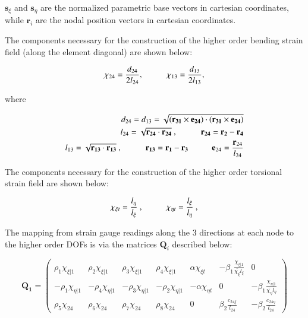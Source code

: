 $\textbf{s}_\xi$ and $\textbf{s}_\eta$ are the normalized parametric base vectors in cartesian coordinates, while $\textbf{r}_i$ are the nodal position vectors in cartesian coordinates.

The components necessary for the construction of the higher order bending strain field (along the element diagonal) are shown below: 

\begin{equation} 
\chi_{24} = \frac{d_{24}}{2 l_{24}},
\hspace{10mm}
\chi_{13} = \frac{d_{13}}{2 l_{13}},
\label{equation12chi24}
\end{equation}

where

\begin{align*} 
	d_{24} = d_{13} = \sqrt{(\mathbf{r_{31}} \times \mathbf{e_{24}}) \cdot (\mathbf{r_{31}} \times \mathbf{e_{24}})} \\
	l_{24} = \sqrt{\mathbf{r_{24}} \cdot \mathbf{r_{24}}}\ ,
	\hspace{10mm}
	\mathbf{r_{24}} = \mathbf{r_2} - \mathbf{r_4} \\
	l_{13} = \sqrt{\mathbf{r_{13}} \cdot \mathbf{r_{13}}}\ ,
	\hspace{10mm}
	\mathbf{r_{13}} = \mathbf{r_1} - \mathbf{r_3}
	\hspace{10mm}
	\mathbf{e}_{24} = \frac{\mathbf{r}_{24}}{l_{24}}
\end{align*}

The components necessary for the construction of the higher order torsional strain field are shown below:

\begin{equation} 
\chi_{\xi t} = \frac{l_\eta}{l_\xi}\ ,
\hspace{10mm}
\chi_{\eta t} = \frac{l_\xi}{l_\eta}\ ,
\label{equation13}
\end{equation}

The mapping from strain gauge readings along the 3 directions at each node to the higher order DOFs is via the matrices $\mathbf{Q}_i$ described below:

\begin{equation} 
\mathbf{Q_1} =
\begin{pmatrix}
\rho_1 \chi_{\xi | 1} & \rho_2 \chi_{\xi | 1} & \rho_3 \chi_{\xi | 1} & \rho_4 \chi_{\xi | 1} & \alpha \chi_{\xi t} & -\beta_1 \frac{\chi_{\xi | 1}}{\bar{\chi_\xi} l_\xi} & 0  \\	
-\rho_1 \chi_{\eta | 1} & -\rho_4 \chi_{\eta | 1} & -\rho_3 \chi_{\eta | 1} & -\rho_2 \chi_{\eta | 1} & -\alpha \chi_{\eta t} & 0 & -\beta_1 \frac{\chi_{\eta | 1}}{\bar{\chi_\eta} l_\eta} \\
\rho_5 \chi_{24} & \rho_6 \chi_{24} & \rho_7 \chi_{24} & \rho_8 \chi_{24} & 0 & \beta_2 \frac{c_{24 \xi}}{l_{24}} & -\beta_2 \frac{c_{24 \eta}}{l_{24}}
\end{pmatrix}		
\label{equation14}
\end{equation}


